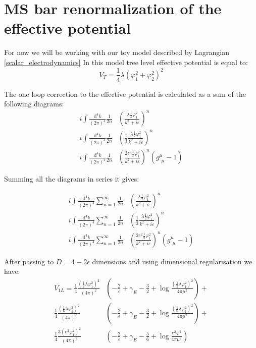 \chapter{MS bar renormalization of the effective potential}

For now we will be working with our toy model described by Lagrangian \ref{scalar_electrodynamics}
In this model tree level effective potential is equal to:
\begin{equation}
V_T = \frac{1}{4}\lambda(\varphi_1^2+\varphi_2^2)^2
\end{equation}


The one loop correction to the effective potential is calculated as a sum of the following diagrams:
\\
\begin{align}
i\int \frac{\textrm{d}^4k}{(2\pi)^4}\frac{1}{2n}&\left(\frac{\lambda\frac{1}{2}\varphi_1^2}
{k^2+i\varepsilon}\right)^n \\
i\int \frac{\textrm{d}^4k}{(2\pi)^4}\frac{1}{2n}&\left(\frac{1}{3}\frac{\lambda\frac{1}
{2}\varphi_1^2}
{k^2+i\varepsilon}\right)^n \\
i\int \frac{\textrm{d}^4k}{(2\pi)^4}\frac{1}{2n}&\left(\frac{2e^2\frac{1}{2}\varphi_1^2}
{k^2+i\varepsilon}\right)^n(g^\mu_{\ \,\mu} - 1)
\end{align}

Summing all the diagrams in series it gives:

\begin{align}
i\int \frac{\textrm{d}^4k}{(2\pi)^4}\sum\limits_{n=1}^{\infty}
\frac{1}{2n}&\left(\frac{\lambda\frac{1}{2}\varphi_1^2}
{k^2+i\varepsilon}\right)^n \\
i\int \frac{\textrm{d}^4k}{(2\pi)^4}\sum\limits_{n=1}^{\infty}\frac{1}{2n}&
\left(\frac{1}{3}\frac{\lambda\frac{1}{2}\varphi_1^2}
{k^2+i\varepsilon}\right)^n \\
i\int \frac{\textrm{d}^4k}{(2\pi)^4}\sum\limits_{n=1}^{\infty}\frac{1}{2n}&
\left(\frac{2e^2\frac{1}{2}\varphi_1^2}
{k^2+i\varepsilon}\right)^n(g^\mu_{\ \,\mu} - 1)
\end{align}

After passing to $D=4-2\epsilon$ dimensions and using dimensional regularisation we have:
\begin{align}
V_{1L}=\frac{1}{4}\frac{(\frac{1}{2}\lambda\varphi_1^2)^2}{(4\pi)^2}&\left(-\frac{2}{\epsilon}
+\gamma_E-\frac{3}{2}+\log{\frac{(\frac{1}{2}\lambda\varphi_1^2)^2}{4\pi\mu^2}}\right) + \\
\frac{1}{4}\frac{(\frac{1}{6}\lambda\varphi_1^2)^2}{(4\pi)^2}&\left(-\frac{2}{\epsilon}
+\gamma_E-\frac{3}{2}+\log{\frac{(\frac{1}{6}\lambda\varphi_1^2)^2}{4\pi\mu^2}}\right) + \\
\frac{1}{4}\frac{3(e^2\varphi_1^2)^2}{(4\pi)^2}&\left(-\frac{2}{\epsilon}+\gamma_E
-\frac{5}{6}+\log{\frac{e^2\varphi^2}{4\pi\mu^2}}\right)
\end{align}

